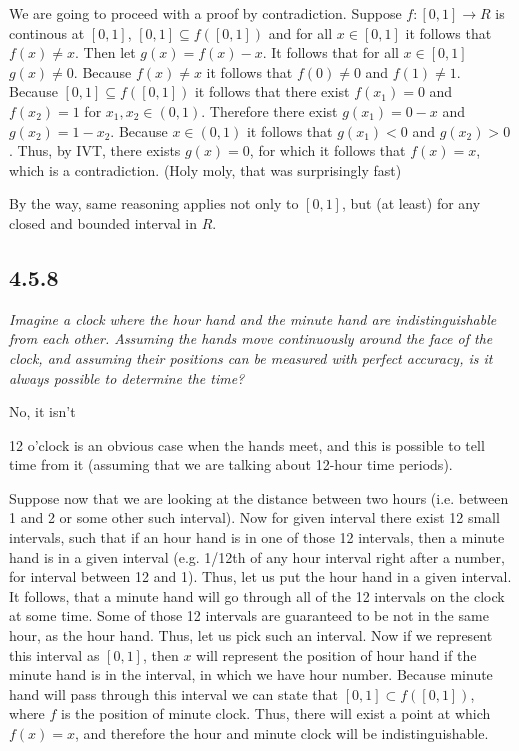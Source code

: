 \documentclass[11pt,oneside,titlepage]{book}
\begin{document}
We are going to proceed with a proof by contradiction.
Suppose $f: [0, 1] \to R$ is
continous at $[0, 1]$, $[0, 1] \subseteq f([0, 1])$ and for all 
$x \in [0, 1]$ it follows that $f(x) \neq x$. Then let 
$g(x) = f(x) - x$.
It follows that for all $x \in [0, 1]$ $g(x) \neq 0$.
Because $f(x) \neq x$ it follows that $f(0) \neq 0$ and $f(1) \neq 1$.
Because $[0, 1] \subseteq f([0, 1])$ it follows that there exist
$f(x_1) = 0$ and $f(x_2) = 1$ for $x_1, x_2 \in (0, 1)$. Therefore
there exist $g(x_1) = 0 - x$ and $g(x_2) = 1 - x_2$. Because $x \in (0, 1)$
it follows that $g(x_1) < 0$ and $g(x_2) > 0$. Thus, by IVT, there
exists $g(x) = 0$, for which it follows that $f(x) = x$, which is a
contradiction. (Holy moly, that was surprisingly fast)

By the way, same reasoning applies not only to $[0, 1]$, but (at least) for
any closed and bounded interval in $R$.

\subsection*{4.5.8}
\textit{Imagine a clock where the hour hand and the minute hand are
  indistinguishable from each other.
  Assuming the hands move continuously around
  the face of the clock, and assuming their positions can be measured with
  perfect accuracy, is it always possible to determine the time?
}

No, it isn't

12 o'clock is an obvious case when the hands meet, and this is possible
to tell time from it (assuming that we are talking about 12-hour time periods).

Suppose now that we are looking at the distance between two hours (i.e.
between 1 and 2 or some other such interval).
Now for given interval there exist 12 small intervals, such that if
an hour hand is in one of those 12 intervals, then a minute hand is in a
given interval (e.g. 1/12th of any hour interval right after a  number,
for interval between 12 and 1). Thus, let us put the hour hand
in a given interval. It follows, that a minute hand will go through all of the
12 intervals on the clock at some time. Some of those 12 intervals are
guaranteed to be not in the same hour, as the hour hand. Thus, let us pick
such an interval. Now if we represent this interval as $[0, 1]$, then
$x$ will represent the position of hour hand if the minute hand is
in the interval, in which we have hour number. Because minute hand will pass
through this interval we can state that $[0, 1] \subset f([0, 1])$, where
$f$ is the position of minute clock. Thus, there will exist a point at
which $f(x) = x$, and therefore the hour and minute clock will be
indistinguishable.
\end{document}
